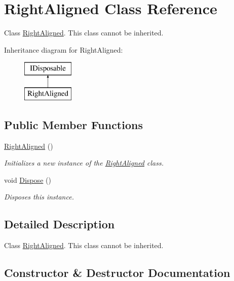 \hypertarget{class_right_aligned}{}\section{Right\+Aligned Class Reference}
\label{class_right_aligned}


Class \hyperlink{class_right_aligned}{Right\+Aligned}. This class cannot be inherited.  


Inheritance diagram for Right\+Aligned\+:\begin{figure}[H]
\begin{center}
\leavevmode
\includegraphics[height=2.000000cm]{class_right_aligned}
\end{center}
\end{figure}
\subsection*{Public Member Functions}
\begin{DoxyCompactItemize}
\item 
\hyperlink{class_right_aligned_ae5c6c09029fe5cec65f31bdcd19c242d}{Right\+Aligned} ()
\begin{DoxyCompactList}\small\item\em Initializes a new instance of the \hyperlink{class_right_aligned}{Right\+Aligned} class. \end{DoxyCompactList}\item 
void \hyperlink{class_right_aligned_aeb1d1e6b5a8a70d2fb506c70eaf1a517}{Dispose} ()
\begin{DoxyCompactList}\small\item\em Disposes this instance. \end{DoxyCompactList}\end{DoxyCompactItemize}


\subsection{Detailed Description}
Class \hyperlink{class_right_aligned}{Right\+Aligned}. This class cannot be inherited. 



\subsection{Constructor \& Destructor Documentation}
\mbox{\label{class_right_aligned_ae5c6c09029fe5cec65f31bdcd19c242d}} 

